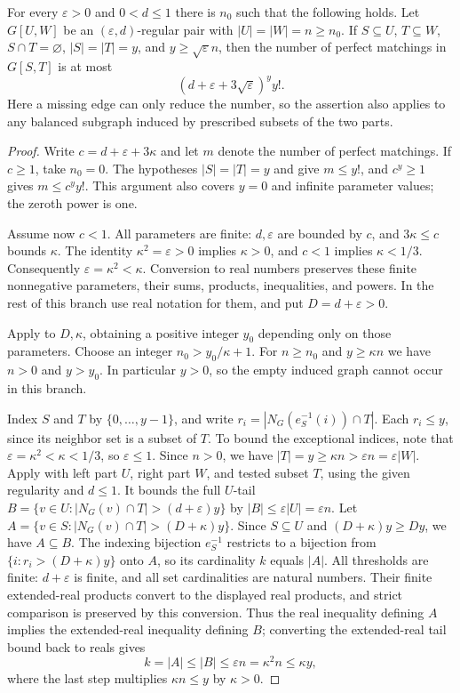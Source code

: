\begin{lemma}
For every $\varepsilon>0$ and $0<d\le1$ there is $n_0$ such that the following holds.  Let $G[U,W]$ be an $(\varepsilon,d)$-regular pair with $|U|=|W|=n\ge n_0$.  If $S\subseteq U$, $T\subseteq W$, $S\cap T=\varnothing$, $|S|=|T|=y$, and $y\ge\sqrt\varepsilon n$, then the number of perfect matchings in $G[S,T]$ is at most
\[
 (d+\varepsilon+3\sqrt\varepsilon)^y y!.
\]
Here a missing edge can only reduce the number, so the assertion also applies to any balanced subgraph induced by prescribed subsets of the two parts.
\end{lemma}
\begin{proof}
Write $c=d+\varepsilon+3\kappa$ and let $m$ denote the number of perfect
matchings. If $c\ge1$, take $n_0=0$. The hypotheses $|S|=|T|=y$ and
 give $m\le y!$, and
$c^y\ge1$ gives $m\le c^y y!$. This argument also covers $y=0$ and
infinite parameter values; the zeroth power is one.

Assume now $c<1$. All parameters are finite: $d,\varepsilon$ are bounded
by $c$, and $3\kappa\le c$ bounds $\kappa$. The identity
$\kappa^2=\varepsilon>0$ implies $\kappa>0$, and $c<1$ implies
$\kappa<1/3$. Consequently $\varepsilon=\kappa^2<\kappa$.
Conversion to real numbers preserves these finite nonnegative
parameters, their sums, products, inequalities, and powers. In the rest
of this branch use real notation for them, and put $D=d+\varepsilon>0$.

Apply  to $D,\kappa$, obtaining
a positive integer $y_0$ depending only on those parameters. Choose an
integer $n_0>y_0/\kappa+1$. For $n\ge n_0$ and $y\ge\kappa n$ we have
$n>0$ and $y>y_0$. In particular $y>0$, so the empty induced graph
cannot occur in this branch.

Index $S$ and $T$ by $\{0,\ldots,y-1\}$, and write
$r_i=|N_G(e_S^{-1}(i))\cap T|$. Each $r_i\le y$, since its neighbor set
is a subset of $T$. To bound the exceptional indices, note that
$\varepsilon=\kappa^2<\kappa<1/3$, so $\varepsilon\le1$.
Since $n>0$, we have
$|T|=y\ge\kappa n>\varepsilon n=\varepsilon|W|$.
Apply  with left part $U$, right part $W$,
and tested subset $T$, using the given regularity and $d\le1$.
It bounds the full $U$-tail
$B=\{v\in U:|N_G(v)\cap T|>(d+\varepsilon)y\}$ by
$|B|\le\varepsilon|U|=\varepsilon n$.
Let $A=\{v\in S:|N_G(v)\cap T|>(D+\kappa)y\}$.
Since $S\subseteq U$ and $(D+\kappa)y\ge Dy$, we have $A\subseteq B$.
The indexing bijection $e_S^{-1}$ restricts to a bijection from
$\{i:r_i>(D+\kappa)y\}$ onto $A$, so its cardinality $k$ equals $|A|$.
All thresholds are finite: $d+\varepsilon$ is finite, and all set
cardinalities are natural numbers. Their finite extended-real products
convert to the displayed real products, and strict comparison is
preserved by this conversion. Thus the real inequality defining $A$
implies the extended-real inequality defining $B$; converting the
extended-real tail bound back to reals gives
\[
 k=|A|\le |B|\le\varepsilon n
   =\kappa^2 n\le\kappa y,
\]
where the last step multiplies $\kappa n\le y$ by $\kappa>0$.


\end{proof}
